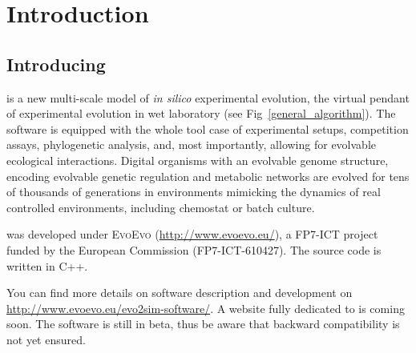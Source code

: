 \chapter{Introduction}

\section{Introducing \packageName}

{\packageName} is a new multi-scale model of \textit{in silico} experimental evolution, the virtual pendant of experimental evolution in wet laboratory (see Fig~\ref{general_algorithm}).
The software is equipped with the whole tool case of experimental setups, competition assays, phylogenetic analysis, and, most importantly, allowing for evolvable ecological interactions. Digital organisms with an evolvable genome structure, encoding evolvable genetic regulation and metabolic networks are evolved for tens of thousands of generations in environments mimicking the dynamics of real controlled environments, including chemostat or batch culture.

{\packageName} was developed under \textsc{EvoEvo} (\href{http://www.evoevo.eu/}{http://www.evoevo.eu/}), a FP7-ICT project funded by the European Commission (FP7-ICT-610427). The source code is written in C++.

You can find more details on software description and development on \href{http://www.evoevo.eu/evo2sim-software/}{http://www.evoevo.eu/evo2sim-software/}. A website fully dedicated to {\packageName} is coming soon. The software is still in beta, thus be aware that backward compatibility is not yet ensured.

